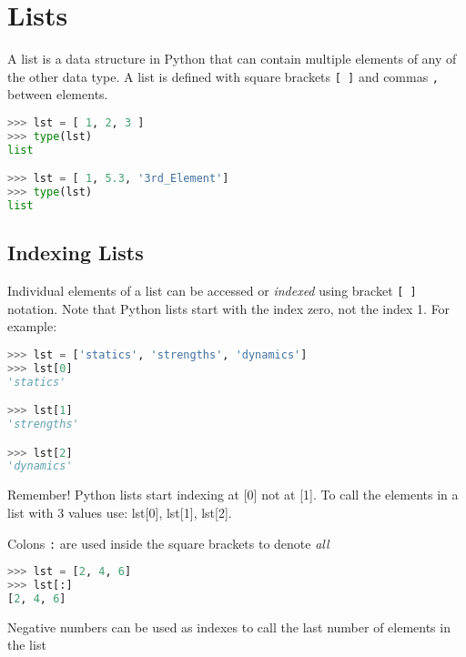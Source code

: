 \documentclass{book}
\newcommand{\passthrough}[1]{#1}
\begin{document}
    
        \hypertarget{lists}{%
\section{Lists}\label{lists}}
    




    
        A list is a data structure in Python that can contain multiple elements
of any of the other data type. A list is defined with square brackets
\passthrough{\lstinline![ ]!} and commas \passthrough{\lstinline!,!}
between elements.

\begin{lstlisting}[language=Python]
>>> lst = [ 1, 2, 3 ]
>>> type(lst)
list

>>> lst = [ 1, 5.3, '3rd_Element']
>>> type(lst)
list
\end{lstlisting}
    




    
        \hypertarget{indexing-lists}{%
\subsection{Indexing Lists}\label{indexing-lists}}

Individual elements of a list can be accessed or \emph{indexed} using
bracket \passthrough{\lstinline![ ]!} notation. Note that Python lists
start with the index zero, not the index 1. For example:

\begin{lstlisting}[language=Python]
>>> lst = ['statics', 'strengths', 'dynamics']
>>> lst[0]
'statics'

>>> lst[1]
'strengths'

>>> lst[2]
'dynamics'
\end{lstlisting}

Remember! Python lists start indexing at {[}0{]} not at {[}1{]}. To call
the elements in a list with 3 values use: lst{[}0{]}, lst{[}1{]},
lst{[}2{]}.

Colons \passthrough{\lstinline!:!} are used inside the square brackets
to denote \emph{all}

\begin{lstlisting}[language=Python]
>>> lst = [2, 4, 6]
>>> lst[:]
[2, 4, 6]
\end{lstlisting}

Negative numbers can be used as indexes to call the last number of
elements in the list
\end{document}
